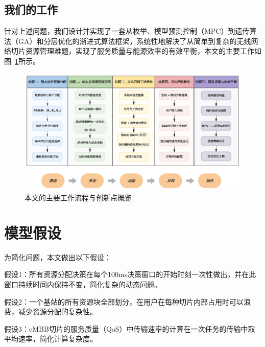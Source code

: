 \documentclass[withoutpreface,bwprint]{cumcmthesis}
\begin{document}

\subsection{我们的工作}
针对上述问题，我们设计并实现了一套从枚举、模型预测控制（MPC）到遗传算法（GA）和分层优化的渐进式算法框架，系统性地解决了从简单到复杂的无线网络切片资源管理难题，实现了服务质量与能源效率的有效平衡，本文的主要工作如图~\ref{fig:our_work}所示。
\begin{figure}[H]
    \centering
    \includegraphics[width=1\textwidth]{figures/3我们的工作.pdf}
    \caption{本文的主要工作流程与创新点概览}
    \label{fig:our_work}
\end{figure}


\section{模型假设}
为简化问题，本文做出以下假设：

假设1：所有资源分配决策在每个100ms决策窗口的开始时刻一次性做出，并在此窗口持续时间内保持不变，简化复杂的动态问题。

假设2：一个基站的所有资源块全部划分，在用户在每种切片内部占用时可以浪费，减少资源分配的复杂性。

假设3：eMBB切片的服务质量（QoS）中传输速率的计算在一次任务的传输中取平均速率，简化计算复杂度。
    

\end{document}
